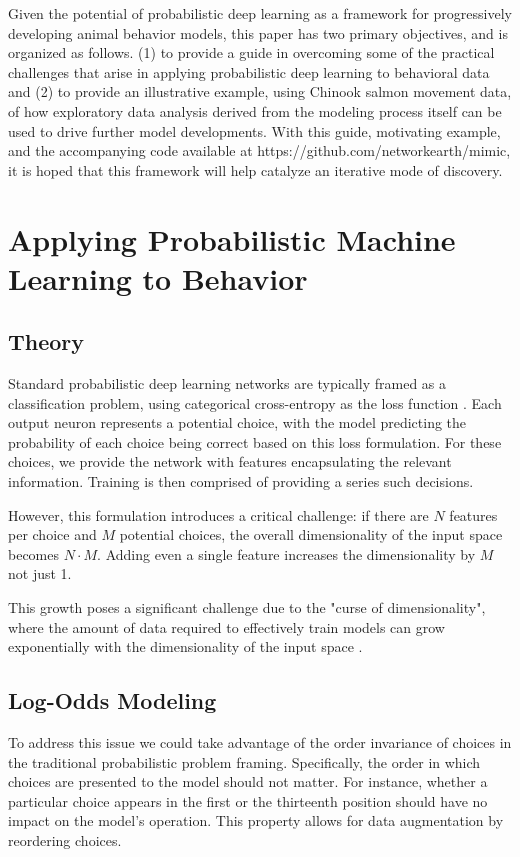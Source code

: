 \documentclass[11pt]{article}
\begin{document}
Given the potential of probabilistic deep learning as a framework for progressively developing animal behavior models, this paper has two primary objectives, and is organized as follows. (1) to provide a guide in overcoming some of the practical challenges that arise in applying probabilistic deep learning to behavioral data and (2) to provide an illustrative example, using Chinook salmon movement data, of how exploratory data analysis derived from the modeling process itself can be used to drive further model developments. With this guide, motivating example, and the accompanying code available at https://github.com/networkearth/mimic, it is hoped that this framework will help catalyze an iterative mode of discovery.

\section*{Applying Probabilistic Machine Learning to Behavior}

\subsection*{Theory}

Standard probabilistic deep learning networks are typically framed as a classification problem, using categorical cross-entropy as the loss function \citep{durr}. Each output neuron represents a potential choice, with the model predicting the probability of each choice being correct based on this loss formulation. For these choices, we provide the network with features encapsulating the relevant information. Training is then comprised of providing a series such decisions. 

However, this formulation introduces a critical challenge: if there are $N$ features per choice and $M$ potential choices, the overall dimensionality of the input space becomes $N \cdot M$. Adding even a single feature increases the dimensionality by $M$ not just 1.

This growth poses a significant challenge due to the "curse of dimensionality", where the amount of data required to effectively train models can grow exponentially with the dimensionality of the input space \citep{curse}.

\subsection*{Log-Odds Modeling}

To address this issue we could take advantage of the order invariance of choices in the traditional probabilistic problem framing. Specifically, the order in which choices are presented to the model should not matter. For instance, whether a particular choice appears in the first or the thirteenth position should have no impact on the model's operation. This property allows for data augmentation by reordering choices.
\end{document}
